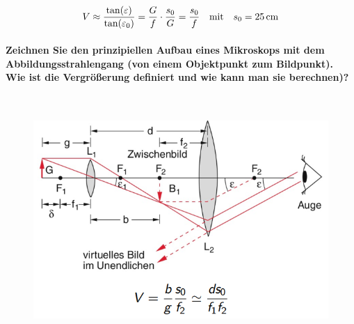 \documentclass[a4paper, 11pt, ngerman, parskip=half-]{scrartcl}
\begin{document}
\begin{equation}
    V \approx \frac{\tan(\varepsilon)}{\tan(\varepsilon_0)} = \frac{G}{f} \cdot \frac{s_0}{G} = \frac{s_0}{f} \qq{mit} s_0 = \SI{25}{cm}
\end{equation}

\paragraph{Zeichnen Sie den prinzipiellen Aufbau eines Mikroskops mit dem Abbildungsstrahlengang
    (von einem Objektpunkt zum Bildpunkt). Wie ist die Vergrößerung definiert und wie kann man sie
    berechnen)?} ~
\begin{figure}[H]
    \centering
    \begin{minipage}[c]{0.5\textwidth}
        \centering
        \includegraphics[width=\linewidth]{image/20/5.png}
    \end{minipage}%
    \qquad
    \begin{minipage}[c]{0.4\textwidth}
        \centering

\end{minipage}
\end{figure}
\end{document}
